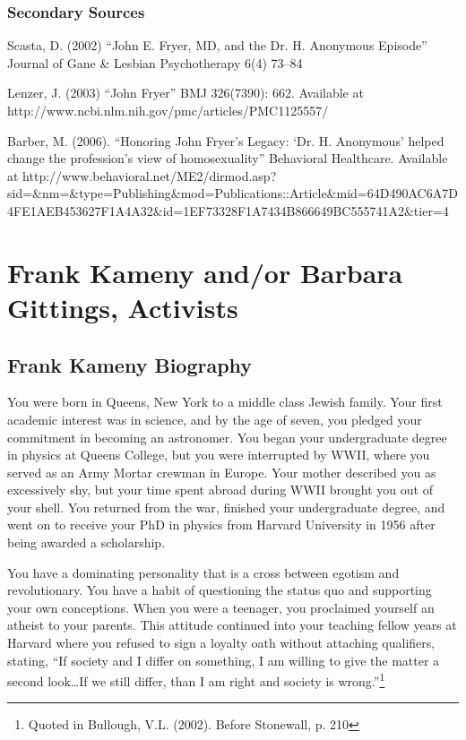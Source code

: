 \subsection{Secondary Sources}
\label{secondarysources}

Scasta, D. (2002) ``John E. Fryer, MD, and the Dr. H. Anonymous Episode'' Journal of Gane \& Lesbian Psychotherapy 6(4) 73--84

Lenzer, J. (2003) ``John Fryer'' BMJ 326(7390): 662. Available at http:\slash \slash www.ncbi.nlm.nih.gov\slash pmc\slash articles\slash PMC1125557\slash 

Barber, M. (2006). ``Honoring John Fryer's Legacy: `Dr. H. Anonymous' helped change the profession's view of homosexuality'' Behavioral Healthcare. Available at http:\slash \slash www.behavioral.net\slash ME2\slash dirmod.asp?sid=\&nm=\&type=Publishing\&mod=Publications::Article\&mid=64D490AC6A7D4FE1AEB453627F1A4A32\&id=1EF73328F1A7434B866649BC555741A2\&tier=4

\chapter{Frank Kameny and\slash or Barbara Gittings, Activists}
\label{frankkamenyandorbarbaragittingsactivists}

\section{Frank Kameny Biography}
\label{frankkamenybiography}

You were born in Queens, New York to a middle class Jewish family. Your first academic interest was in science, and by the age of seven, you pledged your commitment in becoming an astronomer. You began your undergraduate degree in physics at Queens College, but you were interrupted by WWII, where you served as an Army Mortar crewman in Europe. Your mother described you as excessively shy, but your time spent abroad during WWII brought you out of your shell. You returned from the war, finished your undergraduate degree, and went on to receive your PhD in physics from Harvard University in 1956 after being awarded a scholarship.

You have a dominating personality that is a cross between egotism and revolutionary. You have a habit of questioning the status quo and supporting your own conceptions. When you were a teenager, you proclaimed yourself an atheist to your parents. This attitude continued into your teaching fellow years at Harvard where you refused to sign a loyalty oath without attaching qualifiers, stating, ``If society and I differ on something, I am willing to give the matter a second look{\ldots}If we still differ, than I am right and society is wrong.''\footnote{Quoted in Bullough, V.L. (2002). Before Stonewall, p. 210}

